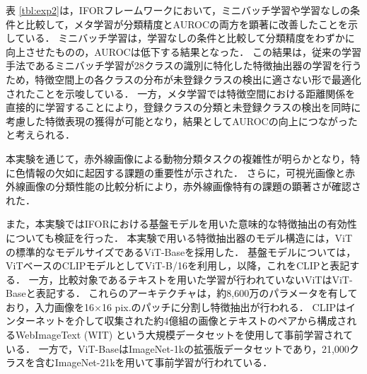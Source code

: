表 \ref{tbl:exp2}は，IFORフレームワークにおいて，ミニバッチ学習や学習なしの条件と比較して，メタ学習が分類精度とAUROCの両方を顕著に改善したことを示している．
ミニバッチ学習は，学習なしの条件と比較して分類精度をわずかに向上させたものの，AUROCは低下する結果となった．
この結果は，従来の学習手法であるミニバッチ学習が28クラスの識別に特化した特徴抽出器の学習を行うため，特徴空間上の各クラスの分布が未登録クラスの検出に適さない形で最適化されたことを示唆している．
一方，メタ学習では特徴空間における距離関係を直接的に学習することにより，登録クラスの分類と未登録クラスの検出を同時に考慮した特徴表現の獲得が可能となり，結果としてAUROCの向上につながったと考えられる．

本実験を通じて，赤外線画像による動物分類タスクの複雑性が明らかとなり，特に色情報の欠如に起因する課題の重要性が示された．
さらに，可視光画像と赤外線画像の分類性能の比較分析により，赤外線画像特有の課題の顕著さが確認された．

また，本実験ではIFORにおける基盤モデルを用いた意味的な特徴抽出の有効性についても検証を行った．
本実験で用いる特徴抽出器のモデル構造には，ViTの標準的なモデルサイズであるViT-Baseを採用した．
基盤モデルについては，ViTベースのCLIPモデルとしてViT-B/16を利用し，以降，これをCLIPと表記する．
一方，比較対象であるテキストを用いた学習が行われていないViTはViT-Baseと表記する．
これらのアーキテクチャは，約8,600万のパラメータを有しており，入力画像を16$\times$16 pix.のパッチに分割し特徴抽出が行われる．
CLIPはインターネットを介して収集された約4億組の画像とテキストのペアから構成されるWebImageText (WIT) という大規模データセットを使用して事前学習されている．
一方で，ViT-BaseはImageNet-1kの拡張版データセットであり，21,000クラスを含むImageNet-21kを用いて事前学習が行われている．

